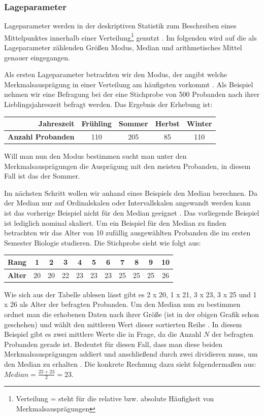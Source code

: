 \subsubsection{Lageparameter}
Lageparameter werden in der deskriptiven Statistik zum Beschreiben eines Mittelpunktes innerhalb einer Verteilung\footnote{Verteilung = steht für die relative bzw. absolute Häufigkeit von Merkmalsausprägungen} genutzt \citep[vgl.][49]{Fahrmeir2016}. Im folgenden wird auf die als Lageparameter zählenden Größen Modus, Median und arithmetisches Mittel genauer eingegangen.

Als ersten Lageparameter betrachten wir den Modus, der angibt welche Merkmalsausprägung in einer Verteilung am häufigsten vorkommt \citep[vgl.][53]{Fahrmeir2016}. Als Beispiel nehmen wir eine Befragung bei der eine Stichprobe von 500 Probanden nach ihrer Lieblingsjahreszeit befragt werden. Das Ergebnis der Erhebung ist:
\begin{center}
\begin{tabular}{r|c|c|c|c} 
\textbf{Jahreszeit} & Frühling & Sommer & Herbst & Winter \\ \hline
\textbf{Anzahl Probanden} & 110 & 205 & 85 & 110\\
\end{tabular}
\end{center}
Will man nun den Modus bestimmen sucht man unter den Merkmalsausprägungen die Ausprägung mit den meisten Probanden, in diesem Fall ist das der Sommer.

Im nächsten Schritt wollen wir anhand eines Beispiels den Median berechnen. Da der Median nur auf Ordinalskalen oder Intervallskalen angewandt werden kann ist das vorherige Beispiel nicht für den Median geeignet \citep[vgl.][52]{Fahrmeir2016}. Das vorliegende Beispiel ist lediglich nominal skaliert.
Um ein Beispiel für den Median zu finden betrachten wir das Alter von 10 zufällig ausgewählten Probanden die im ersten Semester Biologie studieren. Die Stichprobe sieht wie folgt aus:
\begin{center}
\begin{tabular}{r|c|c|c|c|c|c|c|c|c|c} 
\textbf{Rang} & 1 & 2 & 3 & 4 & 5 & 6 & 7 & 8 & 9 & 10 \\ \hline
\textbf{Alter} & 20 & 20 & 22 & 23 & 23 & 23 & 25 & 25 & 25 & 26\\
\end{tabular}
\end{center}
Wie sich aus der Tabelle ablesen lässt gibt es 2 x 20, 1 x 21, 3 x 23, 3 x 25 und 1 x 26 als Alter der befragten Probanden. Um den Median nun zu bestimmen ordnet man die erhobenen Daten nach ihrer Größe (ist in der obigen Grafik schon geschehen) und wählt den mittleren Wert dieser sortierten Reihe \citep[vgl.][52\psq]{Fahrmeir2016}. In diesem Beispiel gibt es zwei mittlere Werte die in Frage, da die Anzahl $N$ der befragten Probanden gerade ist. Bedeutet für diesen Fall, dass man diese beiden Merkmalsausprägungen addiert und anschließend durch zwei dividieren muss, um den Median zu erhalten \citep[vgl.][53]{Fahrmeir2016}. Die konkrete Rechnung dazu sieht folgendermaßen aus: $Median = \frac{23 + 23}{2} = 23$.

